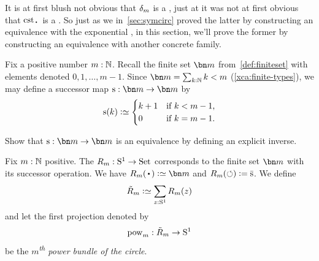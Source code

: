 It is at first blush not obvious that $\dg{m}$ is a \covering,
just at it was not at first obvious that $\cst\base$ is a \covering.
So just as we in~\cref{sec:symcirc} proved the latter by constructing
an equivalence with the exponential \covering,
in this section, we'll prove the former by constructing an equivalence with
another concrete family.

Fix a positive number $m:\mathbb{N}$. Recall the finite set $\bn m$ from~\cref{def:finiteset} with elements denoted $0,1,\dots,m-1$.
Since $\bn m = \sum_{k:\NN}k<m$ (\cref{xca:finite-types}),
we may define a successor map $\zs : \bn m \to \bn m$ by
\[
  \zs(k) \defeq
  \begin{cases}
    k+1 & \text{if $k<m-1$,} \\
    0   & \text{if $k=m-1$.}
  \end{cases}
\]
\begin{exercise}
  Show that $\zs : \bn m \to \bn m$ is an equivalence by defining
  an explicit inverse.
\end{exercise}
\begin{definition}\label{def:RmtoS1}
  Fix $m:\mathbb{N}$ positive.
  The \covering $R_m : {\mathrm{S}^1}\to\mathrm{Set}$ corresponds to the finite set $\bn m$
  with its successor operation. We have $R_m(\base) \defeq \bn m$ and
  $R_m(\Sloop) \defis \etop\zs$. We define
  \[
    \tilde R_m \defeq \sum_{z:\Sc} R_m(z)
  \]
  and let the first projection denoted by
  \[
    \pow{m} : \tilde R_m \to \Sc
  \]
  be the \emph{$m$\textsuperscript{th} power bundle of the circle}.
\end{definition}
